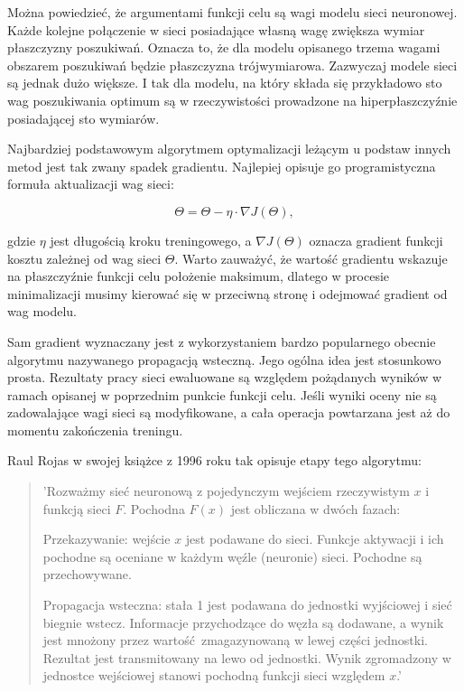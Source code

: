 \begin{enumerate}
    Można powiedzieć, że argumentami funkcji celu są wagi modelu sieci neuronowej.
    Każde kolejne połączenie w sieci posiadające własną wagę zwiększa wymiar
    płaszczyzny poszukiwań. Oznacza to, że dla modelu opisanego trzema wagami
    obszarem poszukiwań będzie płaszczyzna trójwymiarowa. Zazwyczaj modele sieci
    są jednak dużo większe. I tak dla modelu, na który składa się przykładowo sto
    wag poszukiwania optimum są w rzeczywistości prowadzone na hiperpłaszczyźnie
    posiadającej sto wymiarów.

    Najbardziej podstawowym algorytmem optymalizacji leżącym u podstaw innych
    metod jest tak zwany spadek gradientu. Najlepiej opisuje go programistyczna
    formuła aktualizacji wag sieci:

    \[\Theta = \Theta - \eta \cdot \nabla J(\Theta),\]

    gdzie $\eta$ jest długością kroku treningowego, a $\nabla J(\Theta)$ oznacza
    gradient funkcji kosztu zależnej od wag sieci $\Theta$. Warto zauważyć, że
    wartość gradientu wskazuje na płaszczyźnie funkcji celu położenie maksimum,
    dlatego w procesie minimalizacji musimy kierować się w przeciwną stronę i odejmować
    gradient od wag modelu.

    Sam gradient wyznaczany jest z wykorzystaniem bardzo popularnego obecnie
    algorytmu nazywanego propagacją wsteczną. Jego ogólna idea jest stosunkowo
    prosta. Rezultaty pracy sieci ewaluowane są względem pożądanych wyników w
    ramach opisanej w poprzednim punkcie funkcji celu. Jeśli wyniki oceny nie są
    zadowalające wagi sieci są modyfikowane, a cała operacja powtarzana jest aż
    do momentu zakończenia treningu.

    Raul Rojas w swojej książce \cite{systematic_introduction} z 1996 roku tak
    opisuje etapy tego algorytmu:

    \begin{quote}
      'Rozważmy sieć neuronową z pojedynczym wejściem rzeczywistym $x$ i funkcją
      sieci $F$. Pochodna $F(x)$ jest obliczana w dwóch fazach:

      Przekazywanie: wejście $x$ jest podawane do sieci. Funkcje aktywacji i ich pochodne są oceniane w każdym węźle (neuronie) sieci. Pochodne są przechowywane.

      Propagacja wsteczna: stała 1 jest podawana do jednostki wyjściowej i sieć biegnie wstecz. Informacje przychodzące do węzła są dodawane, a wynik jest mnożony przez wartość zmagazynowaną w lewej części jednostki. Rezultat jest transmitowany na lewo od jednostki. Wynik zgromadzony w jednostce wejściowej stanowi pochodną funkcji sieci względem $x$.'
    \end{quote}


\end{enumerate}
